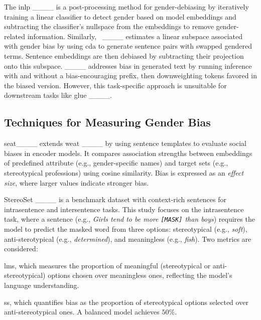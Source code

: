 The \gls{inlp} ____ is a post-processing method for gender-debiasing by iteratively training a linear classifier to detect gender based on model embeddings and subtracting the classifier's nullspace from the embeddings to remove gender-related information.
Similarly, \sentencedebias\ ____ estimates a linear subspace associated with gender bias by using \gls{cda} to generate sentence pairs with swapped gendered terms. %
Sentence embeddings are then debiased by subtracting their projection onto this subspace.
\selfdebias____ addresses bias in generated text by running inference with and without a bias-encouraging prefix, then downweighting tokens favored in the biased version. 
However, this task-specific approach is unsuitable for downstream tasks like \acrshort{glue} ____.

\subsection{Techniques for Measuring Gender Bias} \label{sec:measuring-gender-bias}

\gls{seat}____ extends \gls{weat} ____ by using sentence templates to evaluate social biases in encoder models. It compares association strengths between embeddings of predefined attribute (e.g., gender-specific names) and target sets (e.g., stereotypical professions) using cosine similarity. 
Bias is expressed as an \emph{effect size}, where larger values indicate stronger bias. 

StereoSet ____ is a benchmark dataset with context-rich sentences for intrasentence and intersentence tasks.
This study focuses on the intrasentence task, where a sentence (e.g., \emph{Girls tend to be more \texttt{[MASK]} than boys}) requires the model to predict the masked word from three options: stereotypical (e.g., \emph{soft}), anti-sterotypical (e.g., \emph{determined}), and meaningless (e.g., \emph{fish}).
Two metrics are considered: 
\begin{enumerate*}[label=\textbf{\arabic*)}] 
\item \gls{lms}, which measures the proportion of meaningful (stereotypical or anti-stereotypical) options chosen over meaningless ones, reflecting the model’s language understanding. 
\item \gls{ss}, which quantifies bias as the proportion of stereotypical options selected over anti-stereotypical ones. A balanced model achieves $50\%$. \end{enumerate*}


